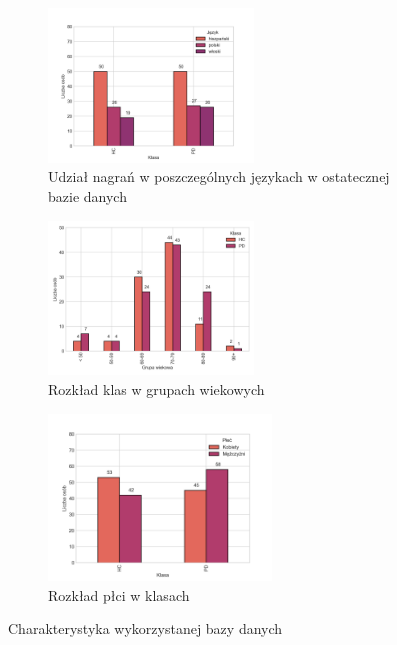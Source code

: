 \begin{figure}
    \begin{subfigure}{0.9\textwidth}
        \centering
       	\includegraphics[width=0.60\textwidth]{./img/database stats/languages_distribution}
	    \caption{Udział nagrań w poszczególnych językach w ostatecznej bazie danych}
        \label{fig:language-distribution}
    \end{subfigure}

    \begin{subfigure}{0.9\textwidth}
        \centering
        \includegraphics[width=0.60\textwidth]{./img/database stats/age_distribution}
        \caption{Rozkład klas w grupach wiekowych}
        \label{fig:age-distribution}
    \end{subfigure}

    \begin{subfigure}{0.9\textwidth}
        \centering
       \includegraphics[width=0.65\textwidth]{./img/database stats/gender_distribution}
	    \caption{Rozkład płci w klasach}
        \label{fig:gender-distribution}
    \end{subfigure}

    \caption{Charakterystyka wykorzystanej bazy danych}
    \label{fig:charakterystyka-bazy}
\end{figure}



